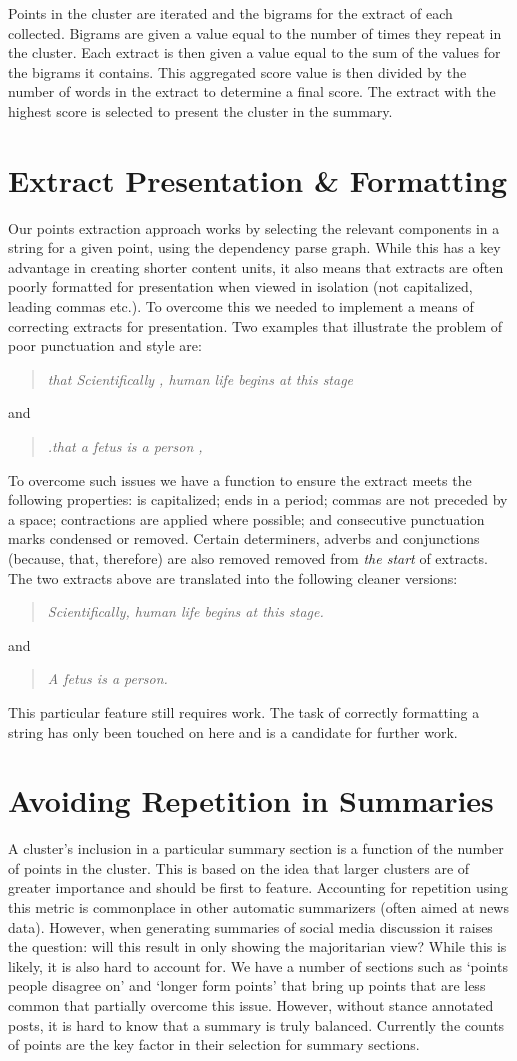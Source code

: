     Points in the cluster are iterated and the bigrams for the extract of each collected. Bigrams are given a value equal to the number of times they repeat in the cluster. Each extract is then given a value equal to the sum of the values for the bigrams it contains. This aggregated score value is then divided by the number of words in the extract to determine a final score. The extract with the highest score is selected to present the cluster in the summary.

  \section{Extract Presentation \& Formatting}
    Our points extraction approach works by selecting the relevant components in a string for a given point, using the dependency parse graph. While this has a key advantage in creating shorter content units, it also means that extracts are often poorly formatted for presentation when viewed in isolation (not capitalized, leading commas etc.). To overcome this we needed to implement a means of correcting extracts for presentation. Two examples that illustrate the problem of poor punctuation and style are: \blockquote{\textit{that Scientifically , human life begins at this stage}} and \blockquote{\textit{.that a fetus is a person ,}}.

    To overcome such issues we have a function to ensure the extract meets the following properties: is capitalized; ends in a period; commas are not preceded by a space; contractions are applied where possible; and consecutive punctuation marks condensed or removed. Certain determiners, adverbs and conjunctions (because, that, therefore) are also removed removed from \textit{the start} of extracts. The two extracts above are translated into the following cleaner versions: \blockquote{\textit{Scientifically, human life begins at this stage.}} and \blockquote{\textit{A fetus is a person.}}.

    This particular feature still requires work. The task of correctly formatting a string has only been touched on here and is a candidate for further work.

  \section{Avoiding Repetition in Summaries}
    A cluster's inclusion in a particular summary section is a function of the number of points in the cluster. This is based on the idea that larger clusters are of greater importance and should be first to feature. Accounting for repetition using this metric is commonplace in other automatic summarizers (often aimed at news data). However, when generating summaries of social media discussion it raises the question: will this result in only showing the majoritarian view? While this is likely, it is also hard to account for. We have a number of sections such as `points people disagree on' and `longer form points' that bring up points that are less common that partially overcome this issue. However, without stance annotated posts, it is hard to know that a summary is truly balanced. Currently the counts of points are the key factor in their selection for summary sections.

